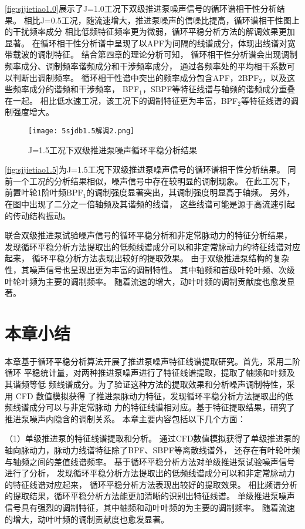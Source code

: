 \autoref{fig:sjjietiao1.0}展示了J=1.0工况下双级推进泵噪声信号的循环谱相干性分析结果。
相比J=0.5工况，随流速增大，推进泵噪声的信噪比提高，循环谱相干性图上的干扰频率成分
相比低频特征频率更为微弱，循环平稳分析方法的解调效果更加显著。
在循环相干性分析谱中呈现了以APF为间隔的线谱成分，体现出线谱对宽带载波的调制特征。
结合第四章的理论分析可知，
循环相干性分析谱会出现调制频率成分、调制频率谐频成分和干涉频率成分，
通过各频率处的平均相干系数可以判断出调制频率。
循环相干性谱中突出的频率成分包含APF，2BPF$_2$，以及这些频率成分的谐频和干涉频率，
BPF$_1$，SBPF等特征线谱与轴频的谐频成分重叠在一起。
相比低水速工况，该工况下的调制特征更为丰富，BPF$_2$等特征线谱的调制强度增大。
\begin{figure}[htbp]
    \centering
    \texttt{[image: 5sjdb1.5解调2.png]}
    \caption{\label{fig:sjjietiao1.5}J=1.5工况下双级推进泵噪声循环平稳分析结果}
\end{figure}

\autoref{fig:sjjietiao1.5}为J=1.5工况下双级推进泵噪声信号的循环谱相干性分析结果。
同前一个工况的分析结果相似，噪声信号中存在较明显的调制现象。
在此工况下，前置叶轮1阶叶频BPF$_1$的调制强度显著突出，其调制强度明显高于轴频。
另外，在图中出现了二分之一倍轴频及其谐频的线谱，
这些线谱可能是源于高流速引起的传动结构振动。

联合双级推进泵试验噪声信号的循环平稳分析和非定常脉动力的特征分析结果，
发现循环平稳分析方法提取出的低频线谱成分可以和非定常脉动力的特征线谱对应起来，
循环平稳分析方法表现出较好的提取效果。
由于双级推进泵结构的复杂性，其噪声信号也呈现出更为丰富的调制特性。
其中轴频和首级叶轮叶频、次级叶轮叶频为主要的调制频率。
随着流速的增大，动叶叶频的调制贡献度也愈发显著。
\section{本章小结}
本章基于循环平稳分析算法开展了推进泵噪声特征线谱提取研究。首先，采用二阶循环
平稳统计量，对两种推进泵噪声进行了特征线谱提取，提取了轴频和叶频及其谐频等低
频线谱成分。为了验证这种方法的提取效果和分析噪声调制特性，采用 CFD 数值模拟获得
了推进泵脉动力特征，发现循环平稳分析方法提取出的低频线谱成分可以与非定常脉动
力的特征线谱相对应。基于特征提取结果，研究了推进泵噪声内隐含的调制关系。
本章主要内容包括以下几个方面：

（1）单级推进泵的特征线谱提取和分析。
通过CFD数值模拟获得了单级推进泵的轴向脉动力，脉动力线谱特征除了BPF、SBPF等离散线谱外，
还存在有叶轮叶频与轴频之间的差值线谱频率。
基于循环平稳分析方法对单级推进泵试验噪声信号进行了分析，
发现循环平稳分析方法提取出的低频线谱成分可以和非定常脉动力的特征线谱对应起来，
循环平稳分析方法表现出较好的提取效果。
相比频谱分析的提取结果，循环平稳分析方法能更加清晰的识别出特征线谱。
单级推进泵噪声信号具有强烈的调制特征，其中轴频和动叶叶频的为主要的调制频率。
随着流速的增大，动叶叶频的调制贡献度也愈发显著。


